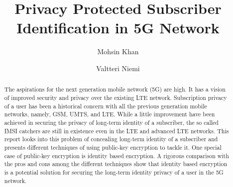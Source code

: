 \documentclass[lnicst,sechang,a4paper]{svmultln}
\begin{document}
\mainmatter  %

\title{Privacy Protected Subscriber Identification in 5G Network}


%
%
\author{Mohsin Khan%
\and Valtteri Niemi}  %


%
%

\maketitle


\begin{abstract}
The aspirations for the next generation mobile network (5G) are high. It has a vision of improved security and privacy over the existing LTE network. Subscription privacy of a user has been a historical concern with all the previous generation mobile networks, namely, GSM, UMTS, and LTE. While a little improvement have been achieved in securing the privacy of long-term identity of a subscriber, the so called IMSI catchers are still in existence even in the LTE and advanced LTE networks. This report looks into this problem of concealing long-term identity of a subscriber and presents different techniques of using public-key encryption to tackle it. One special case of public-key encryption is identity based encryption. A rigorous comparison with the pros and cons among the different techniques show that identity based encryption is a potential solution for securing the long-term identity privacy of a user in the 5G network.
\end{abstract}
\end{document}
